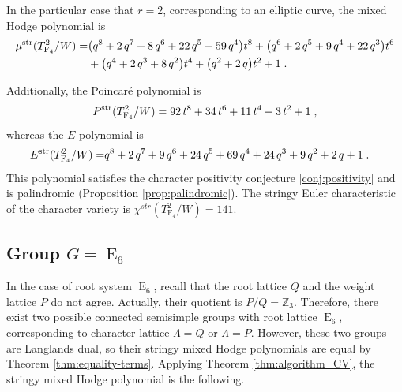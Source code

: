 \documentclass[11pt,english]{amsart}
\numberwithin{equation}{section}
\numberwithin{figure}{section}
\theoremstyle{plain}
\theoremstyle{plain}
\theoremstyle{definition}
\theoremstyle{remark}
\newcommand{\ZZ}{\mathbb{Z}}
\newcommand{\F}{\operatorname{F}}
\newcommand{\E}{\operatorname{E}}
\newcommand{\str}{\textup{str}}
\begin{document}
In the particular case that $r = 2$, corresponding to an elliptic curve, the mixed Hodge polynomial is
\begin{align*}
\mu^{\str}(T_{\F_4}^2/W) =& {\left(q^{8} + 2 \, q^{7} + 8 \, q^{6} + 22 \, q^{5} + 59 \, q^{4}\right)} t^{8} + {\left(q^{6} + 2 \, q^{5} + 9 \, q^{4} + 22 \, q^{3}\right)} t^{6} \\
& + {\left(q^{4} + 2 \, q^{3} + 8 \, q^{2}\right)} t^{4} + {\left(q^{2} + 2 \, q\right)} t^{2} + 1\; .
\end{align*}

Additionally, the Poincar\'e polynomial is
\begin{align*}
    P^{\str}(T_{\F_4}^2/W) = 92 \, t^{8} + 34 \, t^{6} + 11 \, t^{4} + 3 \, t^{2} + 1\; ,
\end{align*}
whereas the $E$-polynomial is
\begin{align*}
E^{\str}(T_{\F_4}^2/W) =& q^{8} + 2 \, q^{7} + 9 \, q^{6} + 24 \, q^{5} + 69 \, q^{4} + 24 \, q^{3} + 9 \, q^{2} + 2 \, q + 1\; .
\end{align*}
This polynomial satisfies the character positivity conjecture \ref{conj:positivity} and is palindromic (Proposition \ref{prop:palindromic}). 
The stringy Euler characteristic of the character variety is $\chi^{str}(T_{\F_4}^2/W)=141$.

\subsection{Group $G = \E_6$} In the case of root system $\E_6$, recall that the root lattice $Q$ and the weight lattice $P$ do not agree. Actually, their quotient is $P/Q = \ZZ_3$. Therefore, there exist two possible connected semisimple groups with root lattice $\E_6$, corresponding to character lattice $\Lambda = Q$ or $\Lambda = P$. However, these two groups are Langlands dual, so their stringy mixed Hodge polynomials are equal by Theorem \ref{thm:equality-terms}.
Applying Theorem \ref{thm:algorithm_CV}, the stringy mixed Hodge polynomial is the following.
\end{document}
